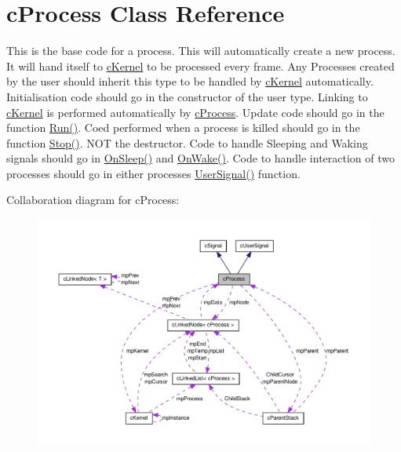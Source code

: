 \hypertarget{classc_process}{
\section{cProcess Class Reference}
\label{classc_process}
}


This is the base code for a process. This will automatically create a new process. It will hand itself to \hyperlink{classc_kernel}{cKernel} to be processed every frame. Any Processes created by the user should inherit this type to be handled by \hyperlink{classc_kernel}{cKernel} automatically. Initialisation code should go in the constructor of the user type. Linking to \hyperlink{classc_kernel}{cKernel} is performed automatically by \hyperlink{classc_process}{cProcess}. Update code should go in the function \hyperlink{classc_process_a3e0fab4ccc0a8fb065d50eb88b6a0dd5}{Run()}. Coed performed when a process is killed should go in the function \hyperlink{classc_process_ab967568c0892c868c5904d27a91072c7}{Stop()}. NOT the destructor. Code to handle Sleeping and Waking signals should go in \hyperlink{classc_process_ad9e66e8d1965e8974ef98121dc123bc5}{OnSleep()} and \hyperlink{classc_process_a5d5c0f3e58dbe50b7859394f16102257}{OnWake()}. Code to handle interaction of two processes should go in either processes \hyperlink{classc_process_a4e343b6a636669dc14103ff0d037f6f6}{UserSignal()} function.  




Collaboration diagram for cProcess:\nopagebreak
\begin{figure}[H]
\begin{center}
\leavevmode
\includegraphics[width=400pt]{classc_process__coll__graph}
\end{center}
\end{figure}
